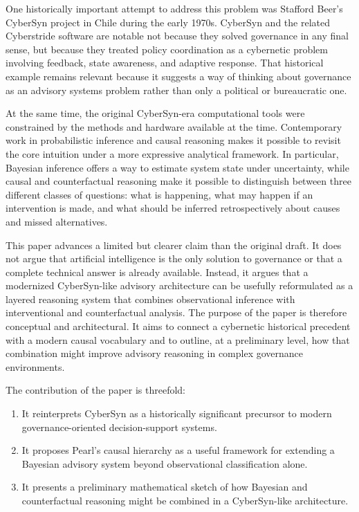 \documentclass[11pt]{article}
\begin{document}
One historically important attempt to address this problem was Stafford Beer's CyberSyn project in Chile during the early 1970s. CyberSyn and the related Cyberstride software are notable not because they solved governance in any final sense, but because they treated policy coordination as a cybernetic problem involving feedback, state awareness, and adaptive response. That historical example remains relevant because it suggests a way of thinking about governance as an advisory systems problem rather than only a political or bureaucratic one.

At the same time, the original CyberSyn-era computational tools were constrained by the methods and hardware available at the time. Contemporary work in probabilistic inference and causal reasoning makes it possible to revisit the core intuition under a more expressive analytical framework. In particular, Bayesian inference offers a way to estimate system state under uncertainty, while causal and counterfactual reasoning make it possible to distinguish between three different classes of questions: what is happening, what may happen if an intervention is made, and what should be inferred retrospectively about causes and missed alternatives.

This paper advances a limited but clearer claim than the original draft. It does not argue that artificial intelligence is the only solution to governance or that a complete technical answer is already available. Instead, it argues that a modernized CyberSyn-like advisory architecture can be usefully reformulated as a layered reasoning system that combines observational inference with interventional and counterfactual analysis. The purpose of the paper is therefore conceptual and architectural. It aims to connect a cybernetic historical precedent with a modern causal vocabulary and to outline, at a preliminary level, how that combination might improve advisory reasoning in complex governance environments.

The contribution of the paper is threefold:
\begin{enumerate}
\item It reinterprets CyberSyn as a historically significant precursor to modern governance-oriented decision-support systems.
\item It proposes Pearl's causal hierarchy as a useful framework for extending a Bayesian advisory system beyond observational classification alone.
\item It presents a preliminary mathematical sketch of how Bayesian and counterfactual reasoning might be combined in a CyberSyn-like architecture.
\end{enumerate}
\end{document}
